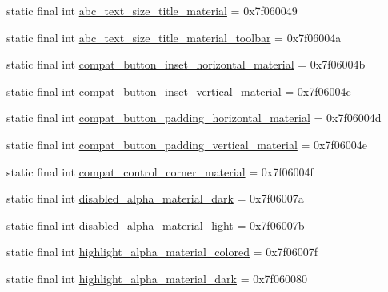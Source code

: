 \begin{DoxyCompactItemize}
\item 
static final int \mbox{\hyperlink{classandroid_1_1support_1_1v7_1_1appcompat_1_1_r_1_1dimen_a44d7dca8af02a27a8d1dd74e7227c7b3}{abc\+\_\+text\+\_\+size\+\_\+title\+\_\+material}} = 0x7f060049
\item 
static final int \mbox{\hyperlink{classandroid_1_1support_1_1v7_1_1appcompat_1_1_r_1_1dimen_af12b0fa15cc97e0cad7d4b0bebdd7aae}{abc\+\_\+text\+\_\+size\+\_\+title\+\_\+material\+\_\+toolbar}} = 0x7f06004a
\item 
static final int \mbox{\hyperlink{classandroid_1_1support_1_1v7_1_1appcompat_1_1_r_1_1dimen_a925336facca4d95d251d9a864d8ad311}{compat\+\_\+button\+\_\+inset\+\_\+horizontal\+\_\+material}} = 0x7f06004b
\item 
static final int \mbox{\hyperlink{classandroid_1_1support_1_1v7_1_1appcompat_1_1_r_1_1dimen_a2cf6a9d975611169adedca0817af556d}{compat\+\_\+button\+\_\+inset\+\_\+vertical\+\_\+material}} = 0x7f06004c
\item 
static final int \mbox{\hyperlink{classandroid_1_1support_1_1v7_1_1appcompat_1_1_r_1_1dimen_a99f8d7484ffb2ede9696546e5d4d751c}{compat\+\_\+button\+\_\+padding\+\_\+horizontal\+\_\+material}} = 0x7f06004d
\item 
static final int \mbox{\hyperlink{classandroid_1_1support_1_1v7_1_1appcompat_1_1_r_1_1dimen_a45a5bf520824d04a23fbc20030a919bd}{compat\+\_\+button\+\_\+padding\+\_\+vertical\+\_\+material}} = 0x7f06004e
\item 
static final int \mbox{\hyperlink{classandroid_1_1support_1_1v7_1_1appcompat_1_1_r_1_1dimen_a6183edfb5a94602dea84f1afc3651b1b}{compat\+\_\+control\+\_\+corner\+\_\+material}} = 0x7f06004f
\item 
static final int \mbox{\hyperlink{classandroid_1_1support_1_1v7_1_1appcompat_1_1_r_1_1dimen_a78e3c6694aea37232a590b844f17b580}{disabled\+\_\+alpha\+\_\+material\+\_\+dark}} = 0x7f06007a
\item 
static final int \mbox{\hyperlink{classandroid_1_1support_1_1v7_1_1appcompat_1_1_r_1_1dimen_a1f1e081830c0d783ecaf9cfee0b9eeb9}{disabled\+\_\+alpha\+\_\+material\+\_\+light}} = 0x7f06007b
\item 
static final int \mbox{\hyperlink{classandroid_1_1support_1_1v7_1_1appcompat_1_1_r_1_1dimen_a468abd7365c28db4fd309195f88935ef}{highlight\+\_\+alpha\+\_\+material\+\_\+colored}} = 0x7f06007f
\item 
static final int \mbox{\hyperlink{classandroid_1_1support_1_1v7_1_1appcompat_1_1_r_1_1dimen_ad93b99bbf97705e8323ca28d22e5b55f}{highlight\+\_\+alpha\+\_\+material\+\_\+dark}} = 0x7f060080

\end{DoxyCompactItemize}

